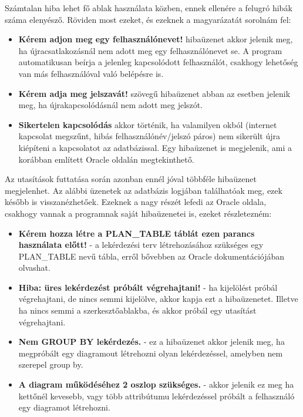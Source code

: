 Számtalan hiba lehet fő ablak használata közben, ennek ellenére a felugró hibák száma elenyésző.
Röviden most ezeket, és ezeknek a magyarázatát sorolnám fel:

\begin{itemize}
  \item \textbf{Kérem adjon meg egy felhasználónevet!} hibaüzenet akkor jelenik meg, ha újracsatlakozásnál nem adott meg
  egy felhasználónevet se. A program automatikusan beírja a jelenleg kapcsolódott felhasználót, csakhogy lehetőség van más felhasználóval való
  belépésre is.
  \item \textbf{Kérem adja meg jelszavát!} szövegű hibaüzenet abban az esetben jelenik meg, ha újrakapcsolódásnál nem adott meg jelszót.
  \item \textbf{Sikertelen kapcsolódás} akkor történik, ha valamilyen okból (internet kapcsolat megszűnt, hibás felhasználónév/jelszó páros) nem sikerült
  újra kiépíteni a kapcsolatot az adatbázissal. Egy hibaüzenet is megjelenik, ami a korábban említett Oracle oldalán\cite{oracledocs} megtekinthető.
\end{itemize}

Az utasítások futtatása során azonban ennél jóval többféle hibaüzenet megjelenhet. Az alábbi üzenetek az adatbázis logjában találhatóak meg, ezek később is visszanézhetőek.
Ezeknek a nagy részét lefedi az Oracle oldala\cite{oracledocs}, csakhogy
vannak a programnak saját hibaüzenetei is, ezeket részletezném:

\begin{itemize}
  \item \textbf{Kérem hozza létre a PLAN\_TABLE táblát ezen parancs használata előtt!} - a lekérdezési terv létrehozásához szükséges egy PLAN\_TABLE nevű tábla,
  erről bővebben az Oracle dokumentációjában\cite{oracledocsref} olvashat.
  \item \textbf{Hiba: üres lekérdezést próbált végrehajtani!} - ha kijelölést próbál végrehajtani, de nincs semmi kijelölve, akkor kapja ezt a hibaüzenetet. Illetve ha
  nincs semmi a szerkesztőablakba, és akkor próbál egy utasítást végrehajtani.
  \item \textbf{Nem GROUP BY lekérdezés.} - ez a hibaüzenet akkor jelenik meg, ha megpróbált egy diagramout létrehozni olyan lekérdezéssel, amelyben nem szerepel group by.
  \item \textbf{A diagram működéséhez 2 oszlop szükséges.} - akkor jelenik ez meg ha kettőnél kevesebb, vagy több attribútumu lekérdezéssel próbált a felhasználó 
  egy diagramot létrehozni.
\end{itemize}


